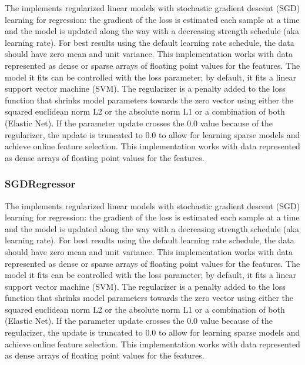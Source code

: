  The  implements regularized linear models with stochastic
 gradient descent (SGD) learning for regression: the gradient of the loss is estimated each sample
 at                         a time and the model is updated along the way with a decreasing strength
 schedule                         (aka learning rate). For best results using the default learning
 rate schedule, the                         data should have zero mean and unit variance.
 This implementation works with data represented as dense or sparse arrays of floating
 point values for the features. The model it fits can be controlled with the loss parameter;
 by default, it fits a linear support vector machine (SVM).                         The regularizer
 is a penalty added to the loss function that shrinks model parameters towards
 the zero vector using either the squared euclidean norm L2 or the absolute norm L1 or a
 combination of both (Elastic Net). If the parameter update crosses the 0.0 value because
 of the regularizer, the update is truncated to $0.0$ to allow for learning sparse models and
 achieve online feature selection.                         This implementation works with data
 represented as dense arrays of floating point values for the features.

\subsubsection{SGDRegressor}
  The  implements regularized linear models with stochastic
  gradient descent (SGD) learning for regression: the gradient of the loss is estimated each sample
  at                         a time and the model is updated along the way with a decreasing
  strength schedule                         (aka learning rate). For best results using the default
  learning rate schedule, the                         data should have zero mean and unit variance.
  This implementation works with data represented as dense or sparse arrays of floating
  point values for the features. The model it fits can be controlled with the loss parameter;
  by default, it fits a linear support vector machine (SVM).                         The regularizer
  is a penalty added to the loss function that shrinks model parameters towards
  the zero vector using either the squared euclidean norm L2 or the absolute norm L1 or a
  combination of both (Elastic Net). If the parameter update crosses the 0.0 value because
  of the regularizer, the update is truncated to $0.0$ to allow for learning sparse models and
  achieve online feature selection.                         This implementation works with data
  represented as dense arrays of floating point values for the features.

